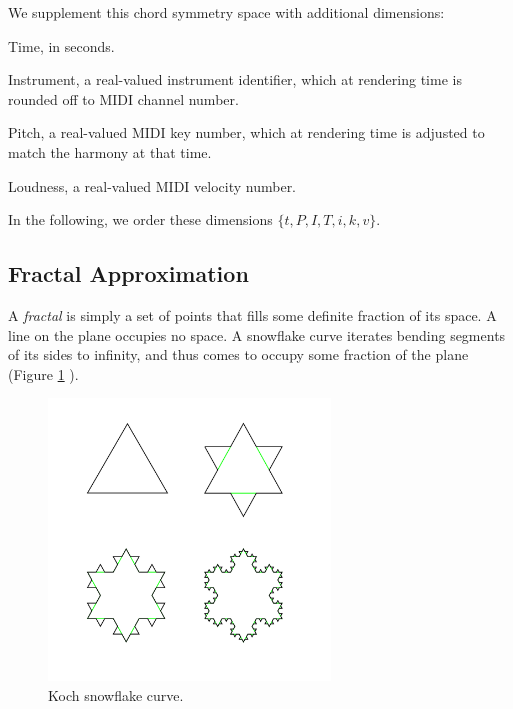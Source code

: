 \documentclass[english,11pt,letterpaper,onecolumn]{scrartcl}
\numberwithin{equation}{section}
\begin{document}
\noindent We supplement this chord symmetry space with additional dimensions:

\begin{description}[resume]
\item[$t$] Time, in seconds.
\item[$i$] Instrument, a real-valued instrument identifier, which at rendering
time is rounded off to MIDI channel number.
\item[$k$] Pitch, a real-valued MIDI key number, which at rendering time is
adjusted to match the harmony at that time.
\item[$v$] Loudness, a real-valued MIDI velocity number.
\end{description}

\noindent In the following, we order these dimensions $\{t, P, I, T, i, k, v \}$.

\subsection{Fractal Approximation}

A \textit{fractal} is simply a set of points that fills some definite fraction
of its space. A line on the plane occupies no space. A snowflake curve
iterates bending segments of its sides to infinity, and thus comes to occupy
some fraction of the plane (Figure \ref{fig:kochflake}
\cite{Mandelbrot:1982:FGN}).

\begin{figure}
\centerline{\includegraphics[width = 0.6667\textwidth]{KochFlake}}
\caption{\label{fig:kochflake} Koch snowflake
curve.\protect\footnotemark}
\end{figure}
\end{document}
